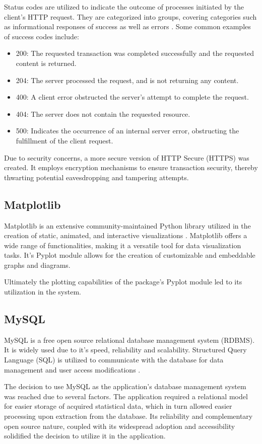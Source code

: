 \documentclass{thesis-ekf}
\theoremstyle{definition}
\theoremstyle{remark}
\begin{document}
{Status codes are utilized to indicate the outcome of processes initiated by the client's HTTP request. They are categorized into groups, covering categories such as informational responses of success as well as errors \cite{wiki-http}. Some common examples of success codes include:
\begin{itemize}
	\item 200: The requested transaction was completed successfully and the requested content is returned.
	\item 204: The server processed the request, and is not returning any content.
	\item 400: A client error obstructed the server's attempt to complete the request.
	\item 404: The server does not contain the requested resource.
	\item 500: Indicates the occurrence of an internal server error, obstructing the fulfillment of the client request.
\end{itemize}

Due to security concerns, a more secure version of HTTP Secure (HTTPS) \cite{wiki-https} was created. It employs encryption mechanisms to ensure transaction security, thereby thwarting potential eavesdropping and tampering attempts. 

\subsection{Matplotlib}
Matplotlib is an extensive community-maintained Python library utilized in the creation of static, animated, and interactive visualizations \cite{matplotlib}. Matplotlib offers a wide range of functionalities, making it a versatile tool for data visualization tasks. It's Pyplot module allows for the creation of customizable and embeddable graphs and diagrams.

Ultimately the plotting capabilities of the package's Pyplot module led to its utilization in the system.

\subsection{MySQL}
MySQL is a free open source relational database management system (RDBMS). It is widely used due to it's speed, reliability and scalability. Structured Query Language (SQL) is utilized to communicate with the database for data management and user access modifications \cite{wiki-mysql}.

The decision to use MySQL as the application's database management system was reached due to several factors. The application required a relational model for easier storage of acquired statistical data, which in turn allowed easier processing upon extraction from the database. Its reliability and complementary open source nature, coupled with its widespread adoption and accessibility solidified the decision to utilize it in the application.

}
\end{document}
